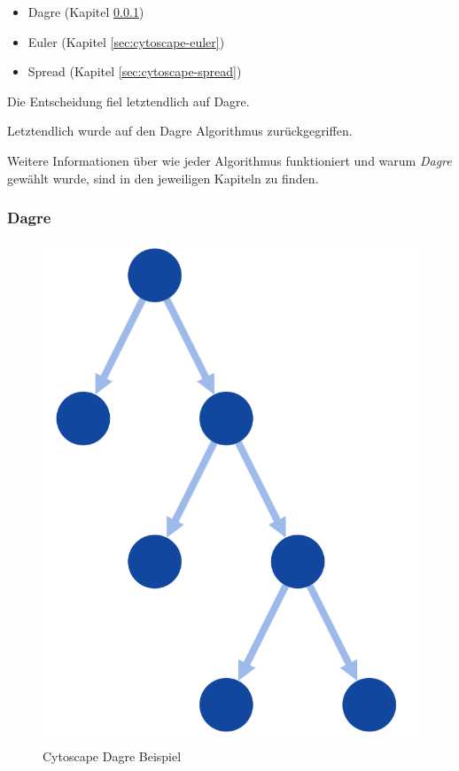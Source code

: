\begin{itemize}
    \item Dagre (Kapitel \ref{sec:cytoscape-dagre})
    \item Euler (Kapitel \ref{sec:cytoscape-euler})
    \item Spread (Kapitel \ref{sec:cytoscape-spread})
\end{itemize}

Die Entscheidung fiel letztendlich auf Dagre.

Letztendlich wurde auf den Dagre Algorithmus zurückgegriffen.

Weitere Informationen über wie jeder Algorithmus funktioniert und warum \textit{Dagre} gewählt wurde, sind in den jeweiligen Kapiteln zu finden.

\subsubsection{Dagre}\label{sec:cytoscape-dagre}

\begin{figure}[H] 
    \begin{center}
        \includegraphics[scale=0.5]{images/cytoscape-dagre-example.png}
        \caption{Cytoscape Dagre Beispiel \cite{cytoscape_dagre}}
        \label{abb:cytoscape-dagre_example}
    \end{center}    
\end{figure}

